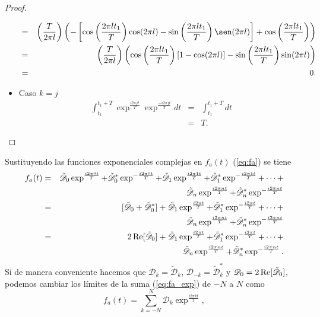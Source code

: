 \documentclass{article}
\renewcommand{\Re}{\operatorname{\rm Re}}
\begin{document}
\begin{proof}
\begin{itemize}
\begin{eqnarray}
&=&\left(\frac{T}{2\pi l}\right)\left(-\left[\cos\left(\frac{2\pi lt_1}{T}\right)\cos(2\pi l)-\sin\left(\frac{2\pi lt_1}{T}\right)\sen(2\pi l)\right]+\cos\left(\frac{2\pi lt_1}{T}\right)\right) \nonumber \\
&=&\left(\frac{T}{2\pi l}\right)\left(\cos\left(\frac{2\pi l t_1}{T}\right)[1-\cos(2\pi l)]-\sin\left(\frac{2\pi lt_1}{T}\right)\sin(2\pi l)\right) \nonumber \\
&=&0. \nonumber
\end{eqnarray}
\item Caso $k=j$ 
\begin{eqnarray}
\int_{t_1}^{t_1+T}\exp^{\frac{i2\pi jt}{T}}\exp^{\frac{-i2\pi jt}{T}}dt&=&\int_{t_1}^{t_1+T}dt \nonumber \\
&=&T. \nonumber 
\end{eqnarray}
\end{itemize}
\end{proof}
Sustituyendo las funciones exponenciales complejas en $f_a(t)$ (\ref{eq:fa}) se tiene
\begin{eqnarray}
f_a(t)&=&\tilde{\mathscr{D}}_0\exp^{\frac{i2\pi 0t}{T}}+\tilde{\mathscr{D}}_0^*\exp^{-\frac{i2\pi 0t}{T}}+\tilde{\mathscr{D}}_1\exp^{\frac{i2\pi 1t}{T}}+\tilde{\mathscr{D}}_1^* \exp^{-\frac{i2\pi 1t}{T}}+\cdots+ \nonumber \\
&&\tilde{\mathscr{D}}_n\exp^{\frac{i2\pi nt}{T}}+\tilde{\mathscr{D}}_n^*\exp^{-\frac{i2\pi nt}{T}} \nonumber \\
&=&[\tilde{\mathscr{D}}_0+\tilde{\mathscr{D}}_0^*]+\tilde{\mathscr{D}}_1\exp^{\frac{i2\pi t}{T}}+\tilde{\mathscr{D}}_1^* \exp^{-\frac{i2\pi t}{T}}+\cdots+ \nonumber \\
&&\tilde{\mathscr{D}}_n\exp^{\frac{i2\pi nt}{T}}+\tilde{\mathscr{D}}_n^*\exp^{-\frac{i2\pi nt}{T}} \nonumber \\
&=&2\Re[\tilde{\mathscr{D}}_0]+\tilde{\mathscr{D}}_1\exp^{\frac{i2\pi t}{T}}+\tilde{\mathscr{D}}_1^* \exp^{-\frac{i2\pi t}{T}}+\cdots+ \nonumber \\
&&\tilde{\mathscr{D}}_n\exp^{\frac{i2\pi nt}{T}}+\tilde{\mathscr{D}}_n^*\exp^{-\frac{i2\pi nt}{T}}. \label{eq:fa_exp}
\end{eqnarray}
Si de manera conveniente hacemos que $\mathscr{D}_{k}=\tilde{\mathscr{D}}_k$, $\mathscr{D}_{-k}=\tilde{\mathscr{D}}_k^*$ y $\mathscr{D}_0=2\Re[\tilde{\mathscr{D}}_0]$, podemos cambiar los l\'imites de la suma (\ref{eq:fa_exp}) de $-N$ a $N$ como
\begin{equation}
f_a(t)=\sum_{k=-N}^N\mathscr{D}_k\exp^{\frac{i2\pi kt}{T}},
\end{equation}
\end{document}
